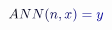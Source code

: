 \documentclass[12pt]{article}
\begin{document}
\makeatletter
\renewcommand*{\@textcolor}[3]{%
  \protect\leavevmode
  \begingroup
    \color#1{#2}#3%
  \endgroup
}
\makeatother
\begin{displaymath}
\mathcolor[RGB]{0,0,15}{A} \mathcolor[RGB]{0,0,30}{N} \mathcolor[RGB]{0,0,45}{N} \mathcolor[RGB]{0,0,60}{(} \mathcolor[RGB]{0,0,75}{n} \mathcolor[RGB]{0,0,90}{,} \mathcolor[RGB]{0,0,105}{x} \mathcolor[RGB]{0,0,120}{)} \mathcolor[RGB]{0,0,135}{=} \mathcolor[RGB]{0,0,150}{y}
\end{displaymath}
\end{document}
